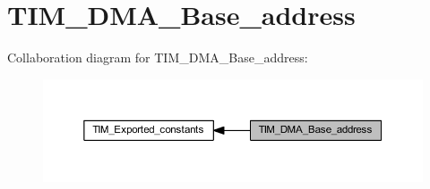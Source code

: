 \hypertarget{group___t_i_m___d_m_a___base__address}{}\section{T\+I\+M\+\_\+\+D\+M\+A\+\_\+\+Base\+\_\+address}
\label{group___t_i_m___d_m_a___base__address}
Collaboration diagram for T\+I\+M\+\_\+\+D\+M\+A\+\_\+\+Base\+\_\+address\+:\nopagebreak
\begin{figure}[H]
\begin{center}
\leavevmode
\includegraphics[width=350pt]{group___t_i_m___d_m_a___base__address}
\end{center}
\end{figure}
